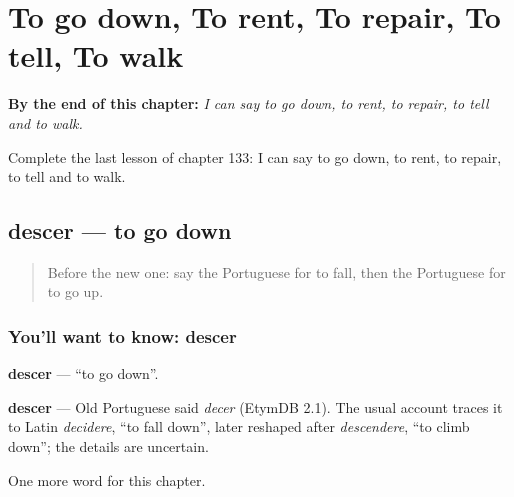 
\chapter{To go down, To rent, To repair, To tell, To walk}
\label{ch:pt-to-go-down-to-rent-to-repair-to-tell-to-walk}

\begin{chapteropening}
\textbf{By the end of this chapter:} \emph{I can say to go down, to rent, to repair, to tell and to walk.}

Complete the last lesson of chapter 133: I can say to go down, to rent, to repair, to tell and to walk.
\end{chapteropening}

\section[descer]{descer — to go down}

\label{lesson:PT-C133-descer}



\begin{quote}
Before the new one: say the Portuguese for to fall, then the Portuguese for to go up.
\end{quote}

\subsection*{You'll want to know: descer}
\textbf{descer} — \textquotedblleft{}to go down\textquotedblright{}.

\begin{cousinweb}
\textbf{descer} — Old Portuguese said \emph{decer} (EtymDB 2.1). The usual account traces it to Latin \emph{decidere}, \textquotedblleft{}to fall down\textquotedblright{}, later reshaped after \emph{descendere}, \textquotedblleft{}to climb down\textquotedblright{}; the details are uncertain.
\end{cousinweb}

\begin{grammarlens}[title={What you've built}]
One more word for this chapter.
\end{grammarlens}

